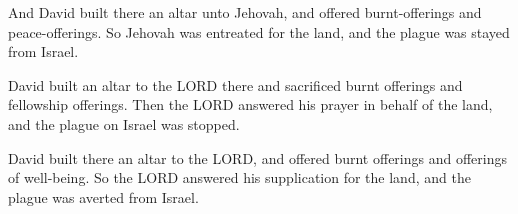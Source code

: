 			\begin{versebox}
					\item[BHS] 
					\item[ASV] And David built there an altar unto Jehovah, and offered burnt-offerings and peace-offerings. So Jehovah was entreated for the land, and the plague was stayed from Israel.
					\item[NIV] David built an altar to the LORD there and sacrificed burnt offerings and fellowship offerings. Then the LORD answered his prayer in behalf of the land, and the plague on Israel was stopped.
					\item[NRSV] David built there an altar to the LORD, and offered burnt offerings and offerings of well-being. So the LORD answered his supplication for the land, and the plague was averted from Israel.
			\end{versebox}
